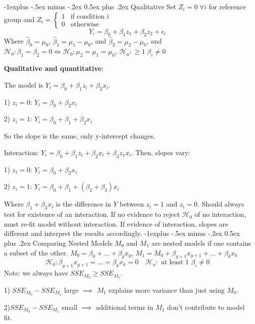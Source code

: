 \documentclass[8pt,landscape]{extarticle}
\makeatletter
\renewcommand{\subsection}{\@startsection{subsection}{2}{0mm}%
                                {-1explus -.5ex minus -.2ex}%
                                {0.5ex plus .2ex}%
                                {\normalfont\normalsize\bfseries}}
\makeatother
\begin{document}
\begin{multicols}{3}
\subsection{Qualitative}
Set $Z_i = 0 \; \forall i$ for reference group and $Z_i =\left\{ \begin{matrix} 1 &\text{if condition i} \\ 0 & \text{otherwise} \end{matrix} \right.$
$$Y_i = \beta_0 + \beta_1 z_1 + \beta_2z_2 + \epsilon_i$$
Where $\hat{\beta}_0 = \mu_0$, $\hat{\beta}_1 = \mu_1 -\mu_0$, and $\hat{\beta}_2 = \mu_2- \mu_0$, and $\mathcal{H}_0 : \beta_1 = \beta_2 = 0 \iff \mathcal{H}_0 :\mu_2 = \mu_1 = \mu_0$, $\mathcal{H}_a: \geq 1 \;\beta_i\neq 0$

\textbf{Qualitative and quantitative}:

The model is $Y_i = \beta_0 + \beta_1z_i + \beta_2 x_i$. 

1) $z_i = 0$: $Y_i = \beta_0 + \beta_2x_i$

2) $z_i = 1$: $Y_i = \beta_0 + \beta_1 + \beta_2x_i$

So the slope is the same, only y-intercept changes.

Interaction: $Y_i = \beta_0 + \beta_1z_i + \beta_2 x_i + \beta_3 z_1 x_i$. Then, slopes vary:

1) $z_i = 0$: $Y_i = \beta_0 + \beta_2x_i$

2) $z_i = 1$: $Y_i = \beta_0 + \beta_1 + (\beta_2 + \beta_3)x_i$

Where $\beta_1 + \beta_3 x_i$ is the difference in $Y$ between $z_i=1$ and $z_i = 0$. Should always test for existence of an interaction.
If no evidence to reject $\mathcal{H}_0$ of no interaction, must re-fit model without interaction.
If evidence of interaction, slopes are different and interpret the results accordingly.
\subsection{Comparing Nested Models}
$M_0$ and $M_1$ are nested models if one contains a subset of the other.
$M_0 = \beta_0+...+ \beta_gx_g$, $M_1 = M_0+ \beta_{g+1}x_{g+1}+...+\beta_kx_k$
$$\mathcal{H}_0: \beta_{g+1}x_{g+1} = ...=\beta_kx_k=0 \quad \mathcal{H}_a : \text{ at least 1 } \beta_i\neq 0$$
Note: we always have $SSE_{M_0}\geq SSE_{M_1} $. 

1) $SSE_{M_0}- SSE_{M_1} $ large $\implies$ $M_1$ explains more variance than just using $M_0$.

2)$SSE_{M_0}- SSE_{M_1} $ small $\implies$ additional terms in $M_1$ don't contribute to model fit.


\end{multicols}
\end{document}
